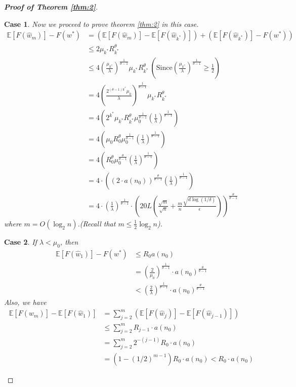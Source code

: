 \documentclass[12pt]{alt2022} %
\newtheorem{case}{Case}
\begin{document}
\begin{proof}[{\bf Proof of Theorem \ref{thm:2}}]
\begin{case}
Now we proceed to prove theorem \ref{thm:2} in this case.
	\begin{equation}
\begin{aligned}
\mathbb{E}[F(\hat{w}_m)]-F(w^{*})&=(\mathbb{E}[F(\hat{w}_m)]-\mathbb{E}[F(\hat{w}_{k^{*}})])+(\mathbb{E}[F(\hat{w}_{k^{*}})]-F(w^{*}))\\
&\leq 2\mu_{k^{*}} R_{k^{*}}^{\theta}\\
&\leq 4\left(\frac{\mu_{k^{*}}}{\lambda}\right)^{\frac{1}{\theta-1}}\mu_{k^{*}}R_{k^{*}}^{\theta}~(\text{Since} \left(\frac{\mu_{k^{*}}}{\lambda}\right)^{\frac{1}{\theta-1}}\geq \frac{1}{2})\\
&=4\left(\frac{2^{(\theta-1)k^{*}}\mu_0}{\lambda}\right)^{\frac{1}{\theta-1}}\mu_{k^{*}}R_{k^{*}}^{\theta}\\
&=4(2^{k^{*}}\mu_{k^{*}} R_{k^{*}}^{\theta}\mu_0^{\frac{1}{\theta -1}}\left(\frac{1}{\lambda}\right)^{\frac{1}{\theta-1}}  )\\
&=4(\mu_0 R_0^{\theta}\mu_0^{\frac{1}{\theta -1}}\left(\frac{1}{\lambda}\right)^{\frac{1}{\theta-1}})\\
&=4( R_0^{\theta}\mu_0^{\frac{\theta}{\theta -1}}\left(\frac{1}{\lambda}\right)^{\frac{1}{\theta-1}})\\
&=4\cdot((2\cdot a(n_0))^{\frac{\theta}{\theta -1}}\left(\frac{1}{\lambda}\right)^{\frac{1}{\theta-1}})
\\&=4\cdot\left(\frac{1}{\lambda}\right)^{\frac{1}{\theta-1}}\cdot\left(20L\left(\frac{\sqrt{m}}{\sqrt{n}}+\frac{m}{n}\frac{\sqrt{d\log(1/\delta)}}{\epsilon}\right)\right)^{\frac{\theta}{\theta -1}}
\end{aligned}
\end{equation}
where $m=O(\log_2 n)$.(Recall that $m\leq \frac{1}{2}\log_2 n$).
\end{case}
\begin{case}
If $\lambda<\mu_0$, then 
	\begin{equation*}
\begin{aligned}
\mathbb{E}[F(\hat{w}_1)]-F(w^{*})&\leq R_0a(n_0)\\&=\left(\frac{2}{\mu_0}\right)^{\frac{1}{\theta-1}}\cdot a(n_0)^{\frac{\theta}{\theta-1}}\\&<\left(\frac{2}{\lambda}\right)^{\frac{1}{\theta-1}}\cdot a(n_0)^{\frac{\theta}{\theta-1}}
\end{aligned}
\end{equation*}
Also, we have 
	\begin{equation*}
\begin{aligned}
\mathbb{E}[F(\hat{w}_m)]-\mathbb{E}[F(\hat{w}_1)]
&=\sum\limits_{j=2}^{m}
(\mathbb{E}[F(\hat{w}_j)]-\mathbb{E}[F(\hat{w}_{j-1})])\\
&\leq \sum\limits_{j=2}^{m}R_{j-1}\cdot a(n_0)\\
&=\sum\limits_{j=2}^{m}2^{-(j-1)}R_0\cdot a(n_0)\\&=(1-(1/2)^{m-1}) R_0 \cdot a(n_0)<R_0\cdot  a(n_0)
\end{aligned}
\end{equation*}


\end{case}
\end{proof}
\end{document}
